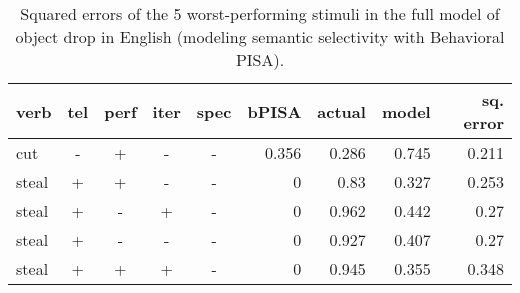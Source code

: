\begin{table}[htb] %
\caption{Squared errors of the 5 worst-performing stimuli in the full model of object drop in English (modeling semantic selectivity with Behavioral PISA).}
\begin{tabular}{l|ccccr|rrr}
\textbf{verb}  & \textbf{tel} & \textbf{perf} & \textbf{iter} & \textbf{spec} & \textbf{bPISA}   & \textbf{actual} & \textbf{model} & \textbf{sq. error} \\
\hline
cut   & -  & +   & -   & -     & 0.356 & 0.286  & 0.745     & 0.211         \\
steal & +  & +   & -   & -     & 0     & 0.83   & 0.327     & 0.253         \\
steal & +  & -   & +   & -     & 0     & 0.962  & 0.442     & 0.27          \\
steal & +  & -   & -   & -     & 0     & 0.927  & 0.407     & 0.27          \\
steal & +  & +   & +   & -     & 0     & 0.945  & 0.355     & 0.348   
\end{tabular}
\end{table}

